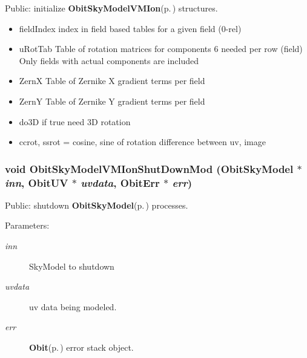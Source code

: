 Public: initialize {\bf Obit\-Sky\-Model\-VMIon}{\rm (p.\,\pageref{structObitSkyModelVMIon})} structures. 

\begin{itemize}
\item field\-Index index in field based tables for a given field (0-rel) \item u\-Rot\-Tab Table of rotation matrices for components 6 needed per row (field) Only fields with actual components are included \item Zern\-X Table of Zernike X gradient terms per field \item Zern\-Y Table of Zernike Y gradient terms per field \item do3D if true need 3D rotation \item ccrot, ssrot = cosine, sine of rotation difference between uv, image 
\end{itemize}
\subsubsection{\setlength{\rightskip}{0pt plus 5cm}void Obit\-Sky\-Model\-VMIon\-Shut\-Down\-Mod ({\bf Obit\-Sky\-Model} $\ast$ {\em inn}, {\bf Obit\-UV} $\ast$ {\em uvdata}, {\bf Obit\-Err} $\ast$ {\em err})}\label{ObitSkyModelVMIon_8h_a8}


Public: shutdown {\bf Obit\-Sky\-Model}{\rm (p.\,\pageref{structObitSkyModel})} processes. 

\begin{Desc}
\item[Parameters:]
\begin{description}
\item[{\em inn}]Sky\-Model to shutdown \item[{\em uvdata}]uv data being modeled. \item[{\em err}]{\bf Obit}{\rm (p.\,\pageref{structObit})} error stack object. \end{description}
\end{Desc}
